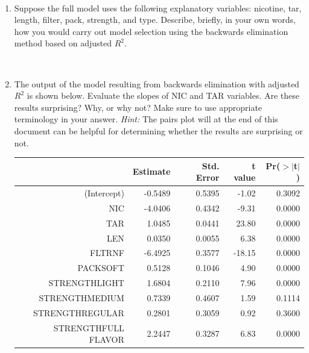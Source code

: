 \documentclass[12pt]{article}
\newcommand{\soln}[2]{$\:$\\ \vspace{#1}}{}
\begin{document}
$\:$ 

\begin{enumerate}

\item Suppose the full model uses the following explanatory variables: nicotine, tar, length, filter, pack, strength, and type.
Describe, briefly, in your own words, how you would carry out model selection using the backwards elimination method based on adjusted $R^2$.

\soln{2cm}{
Fit full model, record its adjusted $R^2$. Then, drop one variable at a time, record each model's adjusted $R^2$. Then, move to the
model with the highest adjusted $R^2$. Stop when adjusted $R^2$ stops increasing.
}

% 

\item The output of the model resulting from backwards elimination with adjusted $R^2$ is shown below. Evaluate the slopes of NIC and 
TAR variables. Are these results surprising? Why, or why not? Make sure to use appropriate terminology in your answer. \textit{Hint:} The 
pairs plot will at the end of this document can be helpful for determining whether the results are surprising or not.

\begin{minipage}[c]{0.55\textwidth}
{\footnotesize
\begin{tabular}{rrrrr}
  \hline
 & Estimate & Std. Error & t value & Pr($>$$|$t$|$) \\ 
  \hline
(Intercept) & -0.5489 & 0.5395 & -1.02 & 0.3092 \\ 
  NIC & -4.0406 & 0.4342 & -9.31 & 0.0000 \\ 
  TAR & 1.0485 & 0.0441 & 23.80 & 0.0000 \\ 
  LEN & 0.0350 & 0.0055 & 6.38 & 0.0000 \\ 
  FLTRNF & -6.4925 & 0.3577 & -18.15 & 0.0000 \\ 
  PACKSOFT & 0.5128 & 0.1046 & 4.90 & 0.0000 \\ 
  STRENGTHLIGHT & 1.6804 & 0.2110 & 7.96 & 0.0000 \\ 
  STRENGTHMEDIUM & 0.7339 & 0.4607 & 1.59 & 0.1114 \\ 
  STRENGTHREGULAR & 0.2801 & 0.3059 & 0.92 & 0.3600 \\ 
  STRENGTHFULL FLAVOR & 2.2447 & 0.3287 & 6.83 & 0.0000 \\ 
   \hline
\end{tabular}
}
\end{minipage}
\begin{minipage}[c]{0.4\textwidth}
$\:$ \\
\end{minipage}


\end{enumerate}
\end{document}
